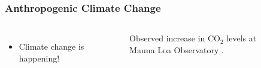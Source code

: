 \begin{frame}
    \frametitle{Anthropogenic Climate Change}


    \begin{columns}
        \column[t]{5cm}
        \begin{itemize}
            \item Climate change is happening!
        \end{itemize}

        \column[t]{5cm}
        \begin{figure}
            \centering
            \resizebox{\columnwidth}{!}{}            
            \caption{Observed increase in CO$_2$ levels at Mauna Loa Observatory \cite{kane_atmospheric_1996}.}
            \label{figure:mauna-loa}
        \end{figure}
    \end{columns}
    

\end{frame}